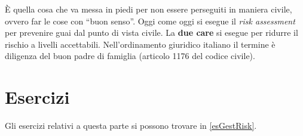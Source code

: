 È quella cosa che va messa in piedi per non essere perseguiti in maniera civile,
ovvero far le cose con ``buon senso''. Oggi come oggi si esegue il \textit{risk
assessment} per prevenire guai dal punto di vista civile. La \textbf{due care}
si esegue per ridurre il rischio a livelli accettabili. Nell'ordinamento
giuridico italiano il termine è diligenza del buon padre di famiglia (articolo
1176 del codice civile).


\section{Esercizi}

Gli esercizi relativi a questa parte si possono trovare in \ref{esGestRisk}.
